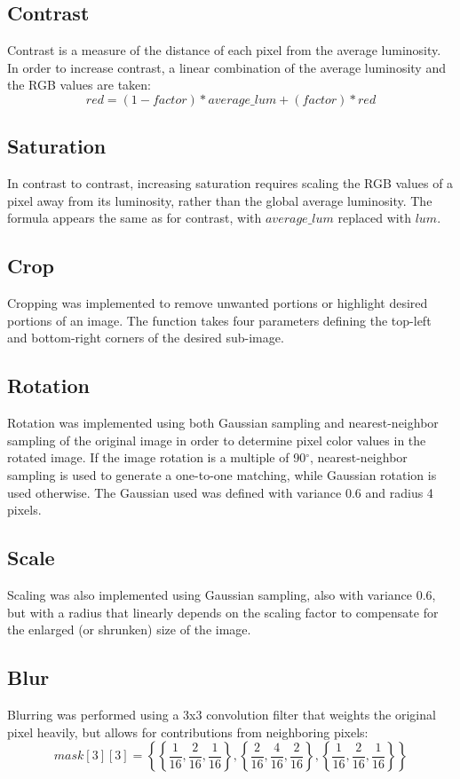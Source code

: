 \documentclass[10pt,twocolumn,twoside]{IEEEtran}
\begin{document}
\subsection{Contrast}
Contrast is a measure of the distance of each pixel from the average luminosity. In order to increase 
contrast, a linear combination of the average luminosity and the RGB values are taken:
\begin{equation*} red = (1 - factor)*average\_lum + (factor)*red \end{equation*}

\subsection{Saturation}
In contrast to contrast, increasing saturation requires scaling the RGB values of a pixel away from its 
luminosity, rather than the global average luminosity. The formula appears the same as for contrast, with 
$average\_lum$ replaced with $lum$.

\subsection{Crop}
Cropping was implemented to remove unwanted portions or highlight desired portions of an image. The function 
takes four parameters defining the top-left and bottom-right corners of the desired sub-image.

\subsection{Rotation}
Rotation was implemented using both Gaussian sampling and nearest-neighbor sampling of the original image in 
order to determine pixel color values in the rotated image. If the image rotation is a multiple of 90$^\circ$, 
nearest-neighbor sampling is used to generate a one-to-one matching, while Gaussian rotation is used 
otherwise. The Gaussian used was defined with variance 0.6 and radius 4 pixels. 

\subsection{Scale}
Scaling was also implemented using Gaussian sampling, also with variance 0.6, but with a radius that linearly 
depends on the scaling factor to compensate for the enlarged (or shrunken) size of the image.

\subsection{Blur}
Blurring was performed using a 3x3 convolution filter that weights the original pixel heavily, but allows for 
contributions from neighboring pixels:
\begin{equation*}
mask[3][3] = \left\{ \left\{\frac{1}{16}, \frac{2}{16}, \frac{1}{16}\right\}, \left\{\frac{2}{16}, \frac{4}
{16}, \frac{2}{16}\right\}, \left\{\frac{1}{16}, \frac{2}{16}, \frac{1}{16}\right\} \right\}
\end{equation*}
\end{document}
